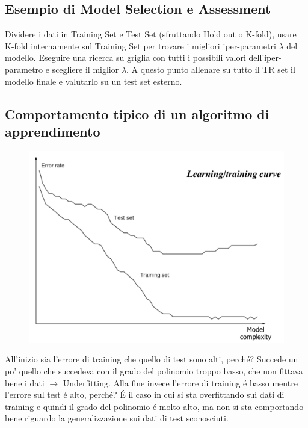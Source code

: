 \documentclass{article}
\begin{document}
\subsection{Esempio di Model Selection e Assessment}
Dividere i dati in Training Set e Test Set (sfruttando Hold out o K-fold), usare K-fold internamente sul Training Set per trovare i migliori iper-parametri $\lambda$ del modello. Eseguire una ricerca su griglia con tutti i possibili valori dell'iper-parametro e scegliere il miglior $\lambda$. A questo punto allenare su tutto il TR set il modello finale e valutarlo su un test set esterno.

\subsection{Comportamento tipico di un algoritmo di apprendimento}
\begin{figure}[H]
\centering
\includegraphics[scale=0.4]{Images/learntraincurve.png}
\end{figure}
All'inizio sia l'errore di training che quello di test sono alti, perché? Succede un po' quello che succedeva con il grado del polinomio troppo basso, che non fittava bene i dati $\rightarrow$ Underfitting. \newline
Alla fine invece l'errore di training é basso mentre l'errore sul test é alto, perché? É il caso in cui si sta overfittando sui dati di training e quindi il grado del polinomio é molto alto, ma non si sta comportando bene riguardo la generalizzazione sui dati di test sconosciuti.
\end{document}
